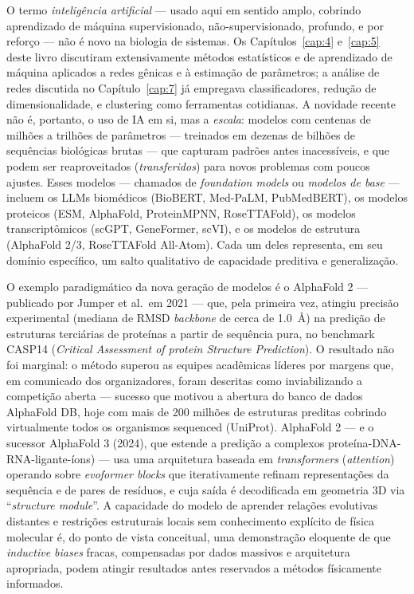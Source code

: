 O termo \emph{inteligência artificial} --- usado aqui em sentido amplo, cobrindo aprendizado de máquina supervisionado, não-supervisionado, profundo, e por reforço --- não é novo na biologia de sistemas. Os Capítulos~\ref{cap:4} e~\ref{cap:5} deste livro discutiram extensivamente métodos estatísticos e de aprendizado de máquina aplicados a redes gênicas e à estimação de parâmetros; a análise de redes discutida no Capítulo~\ref{cap:7} já empregava classificadores, redução de dimensionalidade, e clustering como ferramentas cotidianas. A novidade recente não é, portanto, o uso de IA em si, mas a \emph{escala}: modelos com centenas de milhões a trilhões de parâmetros --- treinados em dezenas de bilhões de sequências biológicas brutas --- que capturam padrões antes inacessíveis, e que podem ser reaproveitados (\emph{transferidos}) para novos problemas com poucos ajustes. Esses modelos --- chamados de \emph{foundation models} ou \emph{modelos de base} --- incluem os LLMs biomédicos (BioBERT, Med-PaLM, PubMedBERT), os modelos proteicos (ESM, AlphaFold, ProteinMPNN, RoseTTAFold), os modelos transcriptômicos (scGPT, GeneFormer, scVI), e os modelos de estrutura (AlphaFold 2/3, RoseTTAFold All-Atom). Cada um deles representa, em seu domínio específico, um salto qualitativo de capacidade preditiva e generalização.



O exemplo paradigmático da nova geração de modelos é o AlphaFold 2 --- publicado por Jumper et al.\ em 2021 --- que, pela primeira vez, atingiu precisão experimental (mediana de RMSD \emph{backbone} de cerca de \SI{1.0}{\angstrom}) na predição de estruturas terciárias de proteínas a partir de sequência pura, no benchmark CASP14 (\emph{Critical Assessment of protein Structure Prediction}). O resultado não foi marginal: o método superou as equipes acadêmicas líderes por margens que, em comunicado dos organizadores, foram descritas como inviabilizando a competição aberta --- sucesso que motivou a abertura do banco de dados AlphaFold DB, hoje com mais de \num{200} milhões de estruturas preditas cobrindo virtualmente todos os organismos sequenced (UniProt). AlphaFold 2 --- e o sucessor AlphaFold 3 (2024), que estende a predição a complexos proteína-DNA-RNA-ligante-íons) --- usa uma arquitetura baseada em \emph{transformers} (\emph{attention}) operando sobre \emph{evoformer blocks} que iterativamente refinam representações da sequência e de pares de resíduos, e cuja saída é decodificada em geometria 3D via ``\emph{structure module}''. A capacidade do modelo de aprender relações evolutivas distantes e restrições estruturais locais sem conhecimento explícito de física molecular é, do ponto de vista conceitual, uma demonstração eloquente de que \emph{inductive biases} fracas, compensadas por dados massivos e arquitetura apropriada, podem atingir resultados antes reservados a métodos físicamente informados.



